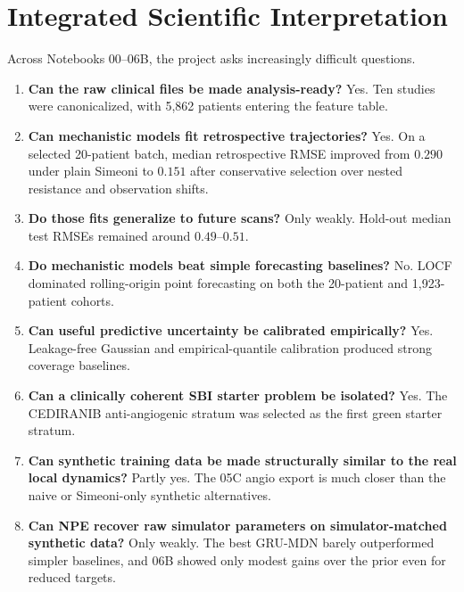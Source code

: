 \documentclass[11pt,a4paper]{article}
\begin{document}
\section{Integrated Scientific Interpretation}

Across Notebooks 00--06B, the project asks increasingly difficult questions.

\begin{enumerate}[leftmargin=2em]
    \item \textbf{Can the raw clinical files be made analysis-ready?}
    Yes. Ten studies were canonicalized, with 5,862 patients entering the feature table.

    \item \textbf{Can mechanistic models fit retrospective trajectories?}
    Yes. On a selected 20-patient batch, median retrospective RMSE improved from $0.290$ under plain Simeoni to $0.151$ after conservative selection over nested resistance and observation shifts.

    \item \textbf{Do those fits generalize to future scans?}
    Only weakly. Hold-out median test RMSEs remained around $0.49$--$0.51$.

    \item \textbf{Do mechanistic models beat simple forecasting baselines?}
    No. LOCF dominated rolling-origin point forecasting on both the 20-patient and 1,923-patient cohorts.

    \item \textbf{Can useful predictive uncertainty be calibrated empirically?}
    Yes. Leakage-free Gaussian and empirical-quantile calibration produced strong coverage baselines.

    \item \textbf{Can a clinically coherent SBI starter problem be isolated?}
    Yes. The CEDIRANIB anti-angiogenic stratum was selected as the first green starter stratum.

    \item \textbf{Can synthetic training data be made structurally similar to the real local dynamics?}
    Partly yes. The 05C angio export is much closer than the naive or Simeoni-only synthetic alternatives.

    \item \textbf{Can NPE recover raw simulator parameters on simulator-matched synthetic data?}
    Only weakly. The best GRU-MDN barely outperformed simpler baselines, and 06B showed only modest gains over the prior even for reduced targets.
\end{enumerate}
\end{document}

